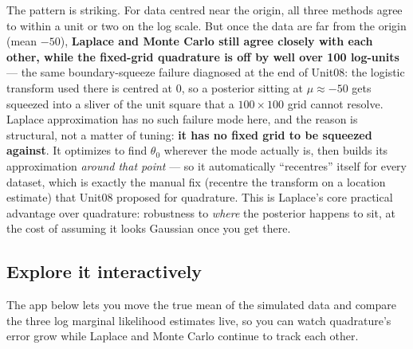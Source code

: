 \documentclass[
  letterpaper,
  DIV=11,
  numbers=noendperiod]{scrreprt}
\begin{document}
The pattern is striking. For data centred near the origin, all three
methods agree to within a unit or two on the log scale. But once the
data are far from the origin (mean \(-50\)), \textbf{Laplace and Monte
Carlo still agree closely with each other, while the fixed-grid
quadrature is off by well over 100 log-units} --- the same
boundary-squeeze failure diagnosed at the end of Unit08: the logistic
transform used there is centred at \(0\), so a posterior sitting at
\(\mu\approx-50\) gets squeezed into a sliver of the unit square that a
\(100\times100\) grid cannot resolve. Laplace approximation has no such
failure mode here, and the reason is structural, not a matter of tuning:
\textbf{it has no fixed grid to be squeezed against}. It optimizes to
find \(\theta_0\) wherever the mode actually is, then builds its
approximation \emph{around that point} --- so it automatically
``recentres'' itself for every dataset, which is exactly the manual fix
(recentre the transform on a location estimate) that Unit08 proposed for
quadrature. This is Laplace's core practical advantage over quadrature:
robustness to \emph{where} the posterior happens to sit, at the cost of
assuming it looks Gaussian once you get there.

\subsection{Explore it interactively}\label{explore-it-interactively-1}

The app below lets you move the true mean of the simulated data and
compare the three log marginal likelihood estimates live, so you can
watch quadrature's error grow while Laplace and Monte Carlo continue to
track each other.
\end{document}

